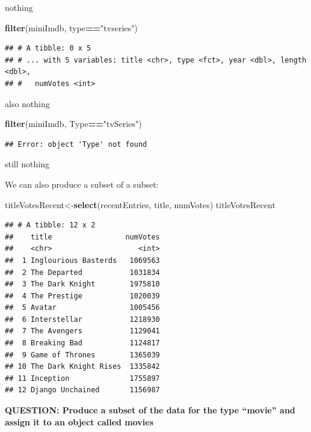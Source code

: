 \documentclass[]{book}
\newenvironment{Shaded}{\begin{snugshade}}{\end{snugshade}}
\newcommand{\KeywordTok}[1]{\textcolor[rgb]{0.13,0.29,0.53}{\textbf{#1}}}
\newcommand{\NormalTok}[1]{#1}
\newcommand{\OperatorTok}[1]{\textcolor[rgb]{0.81,0.36,0.00}{\textbf{#1}}}
\newcommand{\StringTok}[1]{\textcolor[rgb]{0.31,0.60,0.02}{#1}}
\begin{document}
nothing

\begin{Shaded}
\begin{Highlighting}[]
\KeywordTok{filter}\NormalTok{(miniImdb, type}\OperatorTok{==}\StringTok{"tvseries"}\NormalTok{)}
\end{Highlighting}
\end{Shaded}

\begin{verbatim}
## # A tibble: 0 x 5
## # ... with 5 variables: title <chr>, type <fct>, year <dbl>, length <dbl>,
## #   numVotes <int>
\end{verbatim}

also nothing

\begin{Shaded}
\begin{Highlighting}[]
\KeywordTok{filter}\NormalTok{(miniImdb, Type}\OperatorTok{==}\StringTok{"tvSeries"}\NormalTok{)}
\end{Highlighting}
\end{Shaded}

\begin{verbatim}
## Error: object 'Type' not found
\end{verbatim}

still nothing

We can also produce a subset of a subset:

\begin{Shaded}
\begin{Highlighting}[]
\NormalTok{titleVotesRecent<-}\KeywordTok{select}\NormalTok{(recentEntries, title, numVotes)}
\NormalTok{titleVotesRecent}
\end{Highlighting}
\end{Shaded}

\begin{verbatim}
## # A tibble: 12 x 2
##    title                 numVotes
##    <chr>                    <int>
##  1 Inglourious Basterds   1069563
##  2 The Departed           1031834
##  3 The Dark Knight        1975810
##  4 The Prestige           1020039
##  5 Avatar                 1005456
##  6 Interstellar           1218930
##  7 The Avengers           1129041
##  8 Breaking Bad           1124817
##  9 Game of Thrones        1365039
## 10 The Dark Knight Rises  1335842
## 11 Inception              1755897
## 12 Django Unchained       1156987
\end{verbatim}

\textbf{QUESTION: Produce a subset of the data for the type ``movie'' and assign it to an object called movies}
\end{document}
